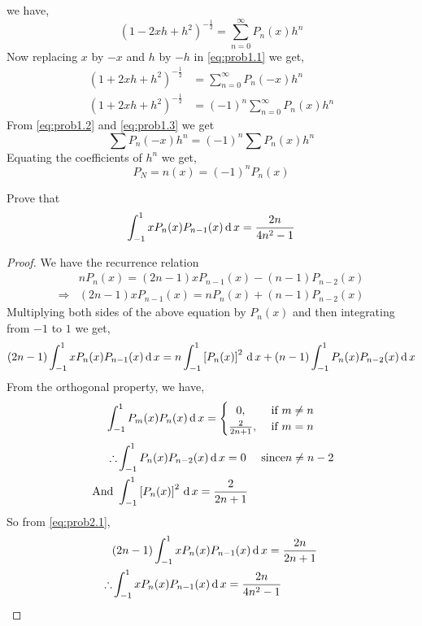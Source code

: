 \documentclass[../main-sheet.tex]{subfiles}
\begin{document}
\begin{soln}
    we have,
    \begin{equation}
        \left(1-2xh+h^2\right)^{-\frac{1}{2}}=\sum_{n=0}^{\infty}P_n(x)h^n\label{eq:prob1.1}
    \end{equation}
    Now replacing $ x $ by $ -x $ and $ h $ by $ -h $ in \eqref{eq:prob1.1} we get,
    \begin{align}
        \left(1+2xh+h^2\right)^{-\frac{1}{2}}&=\sum_{n=0}^{\infty}P_n(-x)h^n \label{eq:prob1.2}\\
        \left(1+2xh+h^2\right)^{-\frac{1}{2}}&=(-1)^n\sum_{n=0}^{\infty}P_n(x)h^n \label{eq:prob1.3}
    \end{align}
    From \eqref{eq:prob1.2} and \eqref{eq:prob1.3} we get
    \[
        \sum P_n(-x)h^n=(-1)^n\sum P_n(x)h^n
    \]
    Equating the coefficients of $ h^n $ we get,
    \[
        P_N=n(x)=(-1)^nP_n(x)
    \]
\end{soln}
\begin{prob}
    Prove that 
    \[
        \int_{-1}^1 xP_n(x)P_{n-1}(x)\,\mathrm{d}\, x=\frac{2n}{4n^2-1}
    \]
\end{prob}
\begin{proof}
    We have the recurrence relation
    \begin{align*}
        &nP_n(x)=(2n-1)xP_{n-1}(x)-(n-1)P_{n-2}(x)\\
        \Rightarrow & (2n-1)x P_{n-1}(x)=nP_{n}(x)+(n-1)P_{n-2}(x)
    \end{align*}
    Multiplying both sides of the above equation by $ P_n(x) $ and then integrating from $ -1 $ to $ 1 $ we get,
    \begin{equation}
        (2n-1)\int_{-1}^1 xP_n(x) P_{n-1}(x)\,\mathrm{d}\, x=n\int_{-1}^1 \left[P_{n}(x)\right]^2\,\mathrm{d}\, x+(n-1)\int_{-1}^1 P_n(x) P_{n-2}(x)\,\mathrm{d}\, x\label{eq:prob2.1}
    \end{equation}
    From the orthogonal property, we have,
    \[
        \int_{-1}^1 P_m(x)P_n(x)\,\mathrm{d}\, x=
        \begin{cases}
            \,\,\,\,0,&\text{ if }m\neq n\\
            \frac{2}{2n+1},&\text{ if }m= n\\
        \end{cases}
    \]
    \begin{align*}
        \therefore & \int_{-1}^1 P_n(x)P_{n-2}(x)\,\mathrm{d}\, x=0 \quad\text{ since} n\neq n-2\\
        \text{ And } & \int_{-1}^1 \left[P_n(x)\right]^2\,\mathrm{d}\, x=\frac{2}{2n+1}\\
    \end{align*}
    So from \eqref{eq:prob2.1},
    \begin{align*}
        &(2n-1)\int_{-1}^1 xP_n(x)P_{n-1}(x)\,\mathrm{d}\, x=\frac{2n}{2n+1}\\
        \therefore & \int_{-1}^1 xP_n(x)P_{n-1}(x)\,\mathrm{d}\, x=\frac{2n}{4n^2-1}\\
    \end{align*}
\end{proof}
\end{document}
